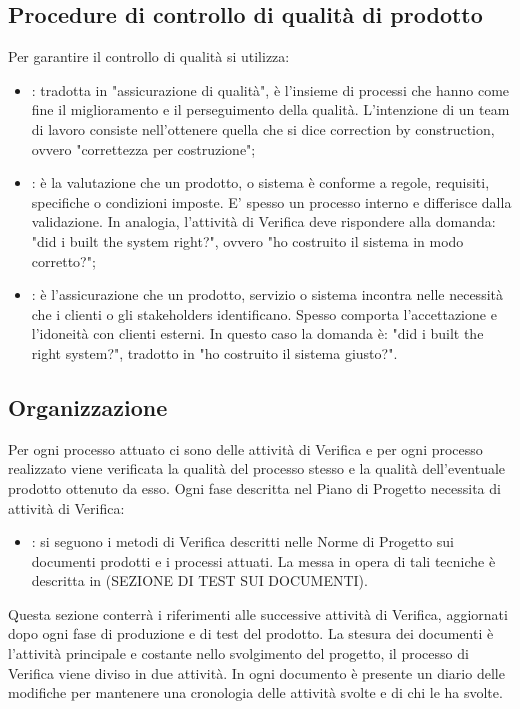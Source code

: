 \subsection{Procedure di controllo di qualità di prodotto} %
\label{2.4}
Per garantire il controllo di qualità si utilizza:
\begin{itemize}
\item {}: tradotta in "assicurazione di qualità", è l'insieme di processi che hanno come fine il miglioramento e il perseguimento della qualità. L'intenzione di un team di lavoro consiste nell'ottenere quella che si dice correction by construction, ovvero "correttezza per costruzione";
\item {}: è la valutazione che un prodotto,  o sistema è conforme a regole, requisiti, specifiche o condizioni imposte. E' spesso un processo interno e differisce dalla validazione. In analogia, l'attività di Verifica deve rispondere alla domanda: "did i built the system right?", ovvero "ho costruito il sistema in modo corretto?";
\item {}: è l'assicurazione che un prodotto, servizio o sistema incontra nelle necessità che i clienti o gli stakeholders identificano. Spesso comporta l'accettazione e l'idoneità con clienti esterni. In questo caso la domanda è: "did i built the right system?", tradotto in "ho costruito il sistema giusto?".
\end{itemize}

\subsection{Organizzazione} %
\label{2.5}
Per ogni processo attuato ci sono delle attività di Verifica e per ogni processo realizzato viene verificata la qualità del processo stesso e la qualità dell'eventuale prodotto ottenuto da esso.
Ogni fase descritta nel Piano di Progetto necessita di attività di Verifica:
\begin{itemize}
\item {}: si seguono i metodi di Verifica descritti nelle Norme di Progetto sui documenti prodotti e i processi attuati. La messa in opera di tali tecniche è descritta in (SEZIONE DI TEST SUI DOCUMENTI).
\end{itemize}
Questa sezione conterrà i riferimenti alle successive attività di Verifica, aggiornati dopo ogni fase di produzione e di test del prodotto.
La stesura dei documenti è l'attività principale e costante nello svolgimento del progetto, il processo di Verifica viene diviso in due attività.
In ogni documento è presente un diario delle modifiche per mantenere una cronologia delle attività svolte e di chi le ha svolte.

